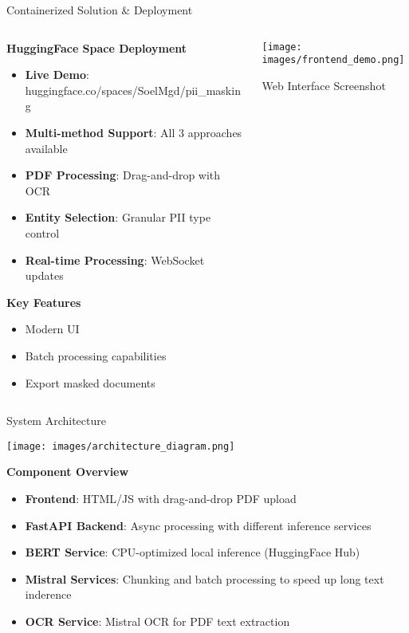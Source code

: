 \documentclass[aspectratio=169]{beamer}
\begin{document}
\begin{frame}{Containerized Solution \& Deployment}
\begin{columns}
\begin{column}{0.5\textwidth}
\textbf{HuggingFace Space Deployment}
\begin{itemize}
\item \textbf{Live Demo}: huggingface.co/spaces/SoelMgd/pii\_masking
\item \textbf{Multi-method Support}: All 3 approaches available
\item \textbf{PDF Processing}: Drag-and-drop with OCR
\item \textbf{Entity Selection}: Granular PII type control
\item \textbf{Real-time Processing}: WebSocket updates
\end{itemize}

\vspace{0.3cm}
\textbf{Key Features}
\begin{itemize}
\item Modern UI
\item Batch processing capabilities
\item Export masked documents
\end{itemize}
\end{column}
\begin{column}{0.5\textwidth}
\begin{center}
\texttt{[image: images/frontend\_demo.png]}
\caption{Web Interface Screenshot}
\end{center}
\end{column}
\end{columns}
\end{frame}

\begin{frame}{System Architecture}
\begin{center}
\texttt{[image: images/architecture\_diagram.png]}
\end{center}

\vspace{0.3cm}
\textbf{Component Overview}
\begin{itemize}
\item \textbf{Frontend}: HTML/JS with drag-and-drop PDF upload
\item \textbf{FastAPI Backend}: Async processing with different inference services
\item \textbf{BERT Service}: CPU-optimized local inference (HuggingFace Hub)
\item \textbf{Mistral Services}: Chunking and batch processing to speed up long text inderence
\item \textbf{OCR Service}: Mistral OCR for PDF text extraction
\end{itemize}
\end{frame}
\end{document}

